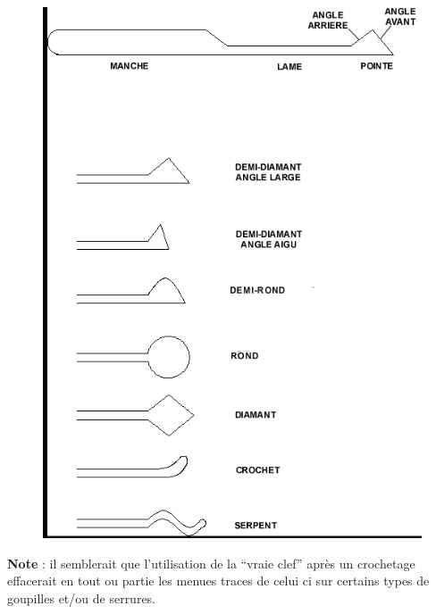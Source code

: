 \documentclass[a4paper,french,11pt,twoside]{report}
\begin{document}
\begin{figure}[h] \begin{center}
        \includegraphics[scale=0.6]{images/Image27}
        \caption{}
\end{center} \end{figure}
\noindent \textbf{Note} : il semblerait que l'utilisation de la \enquote{vraie clef} après un crochetage effacerait en tout ou partie les menues traces de celui ci sur certains types de goupilles et/ou de serrures.
\end{document}
